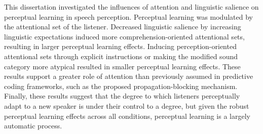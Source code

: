 This dissertation investigated the influences of attention and linguistic salience on perceptual learning in speech perception.
Perceptual learning was modulated by the attentional set of the listener.
Decreased linguistic salience by increasing linguistic expectations induced more comprehension-oriented attentional sets, resulting in larger perceptual learning effects.
Inducing perception-oriented attentional sets through explicit instructions or making the modified sound category more atypical resulted in smaller perceptual learning effects.
These results support a greater role of attention than previously assumed in predictive coding frameworks, such as the proposed propagation-blocking mechanism.
Finally, these results suggest that the degree to which listeners perceptually adapt to a new speaker is under their control to a degree, but given the robust perceptual learning effects across all conditions, perceptual learning is a largely automatic process.


